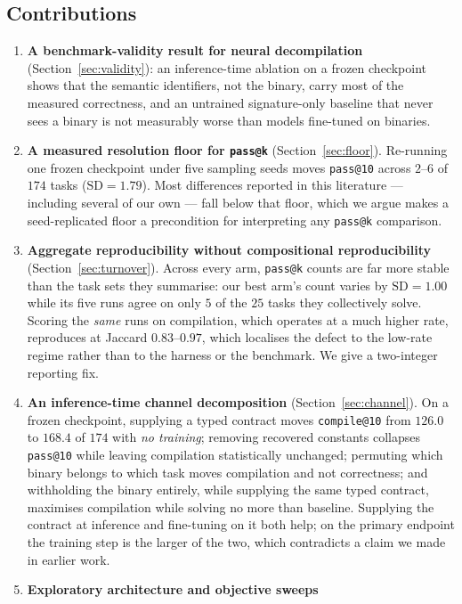 \documentclass[conference]{IEEEtran}
\makeatletter
\newcommand{\passatk}{\texttt{pass@k}\xspace}
\newcommand{\passat}[1]{\texttt{pass@#1}\xspace}
\newcommand{\compileat}[1]{\texttt{compile@#1}\xspace}
\makeatother
\begin{document}
\subsection{Contributions}
\begin{enumerate}[leftmargin=*,topsep=2pt,itemsep=1pt]
\item \textbf{A benchmark-validity result for neural decompilation}
(Section~\ref{sec:validity}): an inference-time ablation on a frozen checkpoint
shows that the semantic identifiers, not the binary, carry most of the measured
correctness, and an untrained signature-only baseline that never sees a binary is
not measurably worse than models fine-tuned on binaries.
\item \textbf{A measured resolution floor for \passatk}
(Section~\ref{sec:floor}). Re-running one frozen checkpoint under five sampling
seeds moves \passat{10} across $2$--$6$ of $174$ tasks ($\mathrm{SD}=1.79$). Most
differences reported in this literature --- including several of our own --- fall
below that floor, which we argue makes a seed-replicated floor a precondition for
interpreting any \passatk comparison.
\item \textbf{Aggregate reproducibility without compositional reproducibility}
(Section~\ref{sec:turnover}). Across every arm, \passatk counts are far more
stable than the task sets they summarise: our best arm's count varies by
$\mathrm{SD}=1.00$ while its five runs agree on only $5$ of the $25$ tasks they
collectively solve. Scoring the \emph{same} runs on compilation, which operates
at a much higher rate, reproduces at Jaccard $0.83$--$0.97$, which localises the
defect to the low-rate regime rather than to the harness or the benchmark. We
give a two-integer reporting fix.
\item \textbf{An inference-time channel decomposition}
(Section~\ref{sec:channel}). On a frozen checkpoint, supplying a typed contract moves
\compileat{10} from $126.0$ to $168.4$ of $174$ with \emph{no training}; removing
recovered constants collapses \passat{10} while leaving compilation statistically
unchanged; permuting which binary belongs to which task moves compilation and
not correctness; and withholding the binary entirely, while supplying the same
typed contract, maximises compilation while solving no more than baseline.
Supplying the contract at inference and fine-tuning on it both help; on the
primary endpoint the training step is the larger of the two, which contradicts a
claim we made in earlier work.
\item \textbf{Exploratory architecture and objective sweeps}

\end{enumerate}
\end{document}
